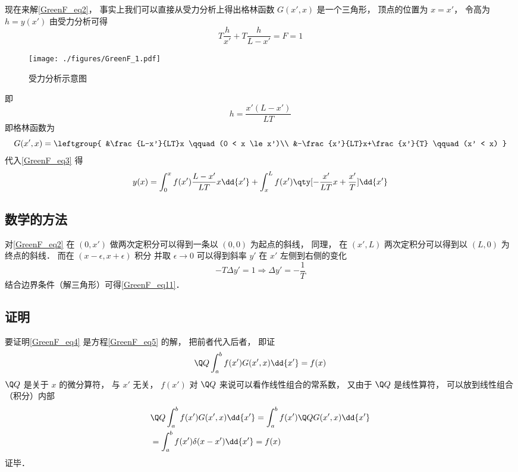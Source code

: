 现在来解\autoref{GreenF_eq2}， 事实上我们可以直接从受力分析上得出格林函数 $G(x', x)$ 是一个三角形， 顶点的位置为 $x = x'$， 令高为 $h = y(x')$ 由受力分析可得
\begin{equation}
T\frac{h}{x'} + T\frac{h}{L - x'} = F = 1
\end{equation}
\begin{figure}[ht]
\centering
\texttt{[image: ./figures/GreenF\_1.pdf]}
\caption{受力分析示意图} \label{GreenF_fig1}
\end{figure}
即
\begin{equation}\label{GreenF_eq11}
h = \frac{x' (L - x')}{LT}
\end{equation}
即格林函数为
\begin{equation}
G(x', x) = \leftgroup{
&\frac{L-x'}{LT}x \qquad (0 < x \le x')\\
&-\frac{x'}{LT}x+\frac{x'}{T} \qquad (x' < x)
}\end{equation}
代入\autoref{GreenF_eq3} 得
\begin{equation}
y(x) = \int_0^x f(x')\frac{L-x'}{LT}x\dd{x'} + \int_x^L f(x')\qty[-\frac{x'}{LT}x+\frac{x'}{T}]\dd{x'}
\end{equation}

\subsection{数学的方法}
对\autoref{GreenF_eq2} 在 $(0, x')$ 做两次定积分可以得到一条以 $(0,0)$ 为起点的斜线， 同理， 在 $(x', L)$ 两次定积分可以得到以 $(L, 0)$ 为终点的斜线． 而在 $(x-\epsilon, x+\epsilon)$ 积分 并取 $\epsilon\to 0$ 可以得到斜率 $y'$ 在 $x'$ 左侧到右侧的变化
\begin{equation}
-T\Delta y' = 1 \Longrightarrow \Delta y' = -\frac{1}{T}
\end{equation}
结合边界条件（解三角形）可得\autoref{GreenF_eq11}．

\subsection{证明}
要证明\autoref{GreenF_eq4} 是方程\autoref{GreenF_eq5} 的解， 把前者代入后者， 即证
\begin{equation}
\Q Q \int_a^b f(x') G(x', x) \dd{x'} = f(x)
\end{equation}
$\Q Q$ 是关于 $x$ 的微分算符， 与 $x'$ 无关， $f(x')$ 对 $\Q Q$ 来说可以看作线性组合的常系数， 又由于 $\Q Q$ 是线性算符， 可以放到线性组合（积分）内部
\begin{equation}\label{GreenF_eq6}
\begin{aligned}
&\Q Q \int_a^b f(x') G(x', x) \dd{x'} = \int_a^b f(x') \Q QG(x', x)\dd{x'}\\
&= \int_a^b f(x') \delta(x - x') \dd{x'} = f(x)
\end{aligned}
\end{equation}
证毕．

